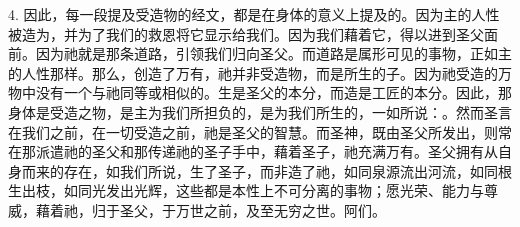 4. 因此，每一段提及受造物的经文，都是在身体的意义上提及的。因为主的人性被造为，并为了我们的救恩将它显示给我们。因为我们藉着它，得以进到圣父面前。因为祂就是那条道路，引领我们归向圣父。而道路是属形可见的事物，正如主的人性那样。那么，创造了万有，祂并非受造物，而是所生的子。因为祂受造的万物中没有一个与祂同等或相似的。生是圣父的本分，而造是工匠的本分。因此，那身体是受造之物，是主为我们所担负的，是为我们所生的，一如所说：。然而圣言在我们之前，在一切受造之前，祂是圣父的智慧。而圣神，既由圣父所发出，则常在那派遣祂的圣父和那传递祂的圣子手中，藉着圣子，祂充满万有。圣父拥有从自身而来的存在，如我们所说，生了圣子，而非造了祂，如同泉源流出河流，如同根生出枝，如同光发出光辉，这些都是本性上不可分离的事物；愿光荣、能力与尊威，藉着祂，归于圣父，于万世之前，及至无穷之世。阿们。\par


